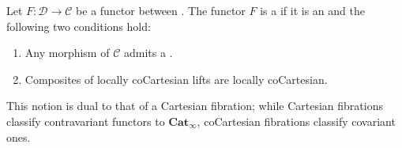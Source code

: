 \begin{definition} \label{definition:coCartesian_fibration_between_infinity_categories}
Let $F : \mathcal{D} \to \mathcal{C}$ be a functor between . The functor $F$ is a  if it is an  and the following two conditions hold:
\begin{enumerate}
    \item Any morphism of $\mathcal{C}$ admits a .
    \item Composites of locally coCartesian lifts are locally coCartesian.
\end{enumerate}

This notion is dual to that of a Cartesian fibration; while Cartesian fibrations classify contravariant functors to $\mathbf{Cat}_\infty$, coCartesian fibrations classify covariant ones.
\end{definition}
